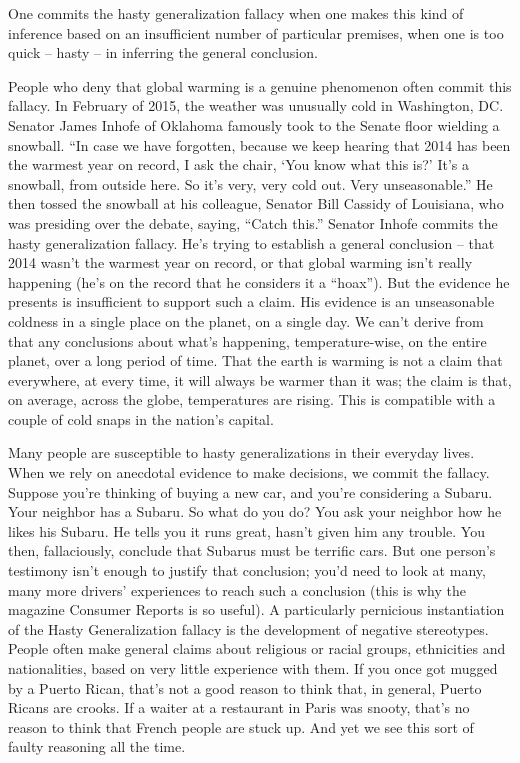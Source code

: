 One commits the hasty generalization fallacy when one makes this kind of inference based on an
insufficient number of particular premises, when one is too quick -- hasty -- in inferring the general
conclusion.

People who deny that global warming is a genuine phenomenon often commit this fallacy. In
February of 2015, the weather was unusually cold in Washington, DC. Senator James Inhofe of
Oklahoma famously took to the Senate floor wielding a snowball. ``In case we have forgotten,
because we keep hearing that 2014 has been the warmest year on record, I ask the chair, `You
know what this is?' It's a snowball, from outside here. So it's very, very cold out. Very
unseasonable.'' He then tossed the snowball at his colleague, Senator Bill Cassidy of Louisiana,
who was presiding over the debate, saying, ``Catch this.''
Senator Inhofe commits the hasty generalization fallacy. He's trying to establish a general
conclusion -- that 2014 wasn't the warmest year on record, or that global warming isn't really
happening (he's on the record that he considers it a ``hoax''). But the evidence he presents is
insufficient to support such a claim. His evidence is an unseasonable coldness in a single place on
the planet, on a single day. We can't derive from that any conclusions about what's happening,
temperature-wise, on the entire planet, over a long period of time. That the earth is warming is not
a claim that everywhere, at every time, it will always be warmer than it was; the claim is that, on
average, across the globe, temperatures are rising. This is compatible with a couple of cold snaps
in the nation's capital.

Many people are susceptible to hasty generalizations in their everyday lives. When we rely on
anecdotal evidence to make decisions, we commit the fallacy. Suppose you're thinking of buying
a new car, and you're considering a Subaru. Your neighbor has a Subaru. So what do you do? You
ask your neighbor how he likes his Subaru. He tells you it runs great, hasn't given him any trouble.
You then, fallaciously, conclude that Subarus must be terrific cars. But one person's testimony
isn't enough to justify that conclusion; you'd need to look at many, many more drivers'
experiences to reach such a conclusion (this is why the magazine Consumer Reports is so useful).
A particularly pernicious instantiation of the Hasty Generalization fallacy is the development of
negative stereotypes. People often make general claims about religious or racial groups, ethnicities
and nationalities, based on very little experience with them. If you once got mugged by a Puerto
Rican, that's not a good reason to think that, in general, Puerto Ricans are crooks. If a waiter at a
restaurant in Paris was snooty, that's no reason to think that French people are stuck up. And yet
we see this sort of faulty reasoning all the time.


